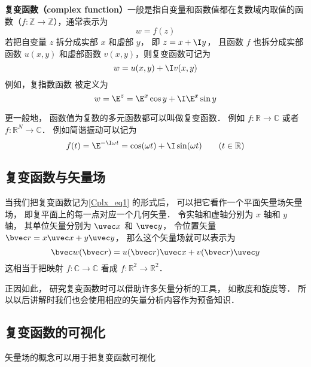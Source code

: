 
\textbf{复变函数（complex function）}一般是指自变量和函数值都在复数域内取值的函数（$f:\mathbb Z \to \mathbb Z$），通常表示为
\begin{equation}
w = f(z)
\end{equation}
若把自变量 $z$ 拆分成实部 $x$ 和虚部 $y$， 即 $z = x + \I y$， 且函数 $f$ 也拆分成实部函数 $u(x,y)$ 和虚部函数 $v(x,y)$，则复变函数可记为
\begin{equation}\label{Cplx_eq1}
w = u(x,y) + \I v(x,y)
\end{equation}
例如，复指数函数 被定义为
\begin{equation}\label{Cplx_eq3}
w = \E^z = \E^x \cos y + \I \E^x\sin y
\end{equation}


更一般地， 函数值为复数的多元函数都可以叫做复变函数． 例如 $f: \mathbb R \to \mathbb C$ 或者 $f:\mathbb R^N \to \mathbb C$． 例如简谐振动可以记为
\begin{equation}
f(t) = \E^{-\I \omega t} = \cos(\omega t) + \I \sin(\omega t) \qquad (t \in \mathbb R)
\end{equation}

\subsection{复变函数与矢量场}
当我们把复变函数记为\autoref{Cplx_eq1} 的形式后， 可以把它看作一个平面矢量场矢量场， 即复平面上的每一点对应一个几何矢量． 令实轴和虚轴分别为 $x$ 轴和 $y$ 轴， 其单位矢量分别为 $\uvec x$ 和 $\uvec y$， 令位置矢量 $\bvec r = x \uvec x + y \uvec y$， 那么这个矢量场就可以表示为
\begin{equation}
\bvec w(\bvec r) = u(\bvec r) \uvec x + v(\bvec r) \uvec y
\end{equation}
这相当于把映射 $f:\mathbb C \to \mathbb C$ 看成 $f: \mathbb R^2 \to \mathbb R^2$．

正因如此， 研究复变函数时可以借助许多矢量分析的工具， 如散度和旋度等． 所以以后讲解时我们也会使用相应的矢量分析内容作为预备知识．

\subsection{复变函数的可视化}
矢量场的概念可以用于把复变函数可视化

